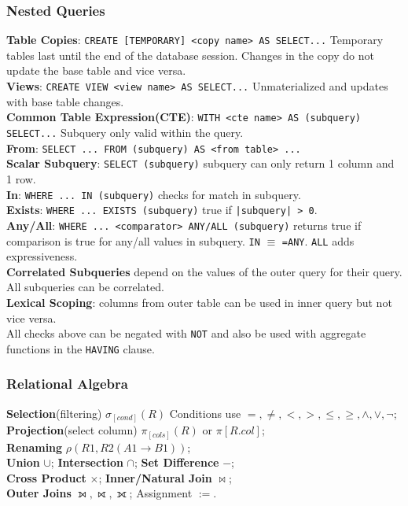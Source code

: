 \begin{multicols*}{3}
\subsubsection{Nested Queries}
\textbf{Table Copies}: \texttt{CREATE [TEMPORARY] <copy name> AS SELECT...} Temporary tables last until the end of the database session. Changes in the copy do not update the base table and vice versa.\\
\textbf{Views}: \texttt{CREATE VIEW <view name> AS SELECT...} Unmaterialized and updates with base table changes.\\
\textbf{Common Table Expression(CTE)}: \texttt{WITH <cte name> AS (subquery) SELECT...} Subquery only valid within the query.\\
\textbf{From}: \texttt{SELECT ... FROM (subquery) AS <from table> ...}\\ 
\textbf{Scalar Subquery}: \texttt{SELECT (subquery)} subquery can only return 1 column and 1 row.\\
\textbf{In}: \texttt{WHERE ... IN (subquery)} checks for match in subquery.\\
\textbf{Exists}: \texttt{WHERE ... EXISTS (subquery)} true if \texttt{|subquery| > 0}.\\
\textbf{Any/All}: \texttt{WHERE ... <comparator> ANY/ALL (subquery)} returns true if comparison is true for any/all values in subquery. \texttt{IN} $\equiv$ \texttt{=ANY}. \texttt{ALL} adds expressiveness.\\
\textbf{Correlated Subqueries} depend on the values of the outer query for their query. All subqueries can be correlated.\\
\textbf{Lexical Scoping}: columns from outer table can be used in inner query but not vice versa.\\
All checks above can be negated with \texttt{NOT} and also be used with aggregate functions in the \texttt{HAVING} clause.\\

\subsubsection{Relational Algebra}
\textbf{Selection}(filtering) $\sigma_{[cond]}(R)$ Conditions use $=,\neq,\lt,\gt,\leq,\geq,\land,\lor,\neg$; \\
\textbf{Projection}(select column) $\pi_{[cols]}(R)$ or $\pi[R.col]$; \\
\textbf{Renaming} $\rho(R1, R2(A1\rightarrow B1))$; \\
\textbf{Union} $\cup$; \textbf{Intersection} $\cap$; \textbf{Set Difference} $-$; \\
\textbf{Cross Product} $\times$; \textbf{Inner/Natural Join} $\bowtie$;\\
\textbf{Outer Joins} $\leftouterjoin, \rightouterjoin, \fullouterjoin$; Assignment $:=$.


\end{multicols*}
